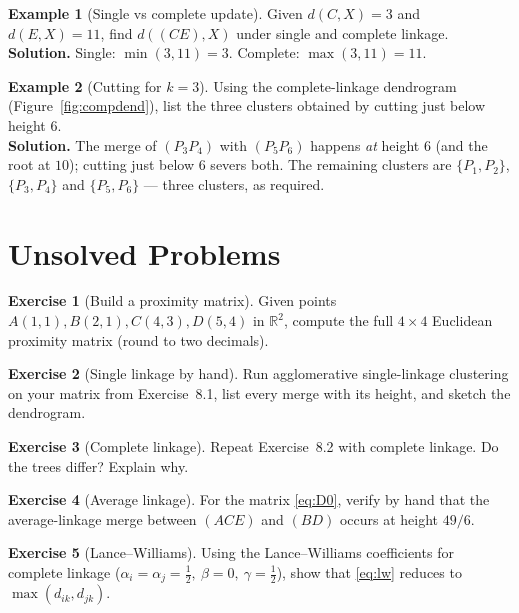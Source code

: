 \documentclass[11pt,a4paper]{report}
\theoremstyle{definition}
\newtheorem{example}{Example}[chapter]
\newtheorem{exercise}{Exercise}[chapter]
\theoremstyle{plain}
\theoremstyle{remark}
\newcommand{\R}{\mathbb{R}}
\begin{document}
\begin{example}[Single vs complete update]
Given $d(C,X)=3$ and $d(E,X)=11$, find $d((CE),X)$ under single and complete
linkage.\\
\textbf{Solution.} Single: $\min(3,11)=3$. Complete: $\max(3,11)=11$.
\end{example}

\begin{example}[Cutting for $k=3$]
Using the complete-linkage dendrogram (Figure~\ref{fig:compdend}), list the
three clusters obtained by cutting just below height $6$.\\
\textbf{Solution.} The merge of $(P_3P_4)$ with $(P_5P_6)$ happens \emph{at}
height $6$ (and the root at $10$); cutting just below $6$ severs both. The
remaining clusters are $\{P_1,P_2\}$, $\{P_3,P_4\}$ and $\{P_5,P_6\}$ --- three
clusters, as required.
\end{example}

\section{Unsolved Problems}

\begin{exercise}[Build a proximity matrix]
Given points $A(1,1),B(2,1),C(4,3),D(5,4)$ in $\R^2$, compute the full
$4\times4$ Euclidean proximity matrix (round to two decimals).
\end{exercise}

\begin{exercise}[Single linkage by hand]
Run agglomerative single-linkage clustering on your matrix from Exercise~8.1,
list every merge with its height, and sketch the dendrogram.
\end{exercise}

\begin{exercise}[Complete linkage]
Repeat Exercise~8.2 with complete linkage. Do the trees differ? Explain why.
\end{exercise}

\begin{exercise}[Average linkage]
For the matrix \eqref{eq:D0}, verify by hand that the average-linkage merge
between $(ACE)$ and $(BD)$ occurs at height $49/6$.
\end{exercise}

\begin{exercise}[Lance--Williams]
Using the Lance--Williams coefficients for complete linkage
($\alpha_i=\alpha_j=\tfrac12,\ \beta=0,\ \gamma=\tfrac12$), show that
\eqref{eq:lw} reduces to $\max(d_{ik},d_{jk})$.
\end{exercise}
\end{document}
